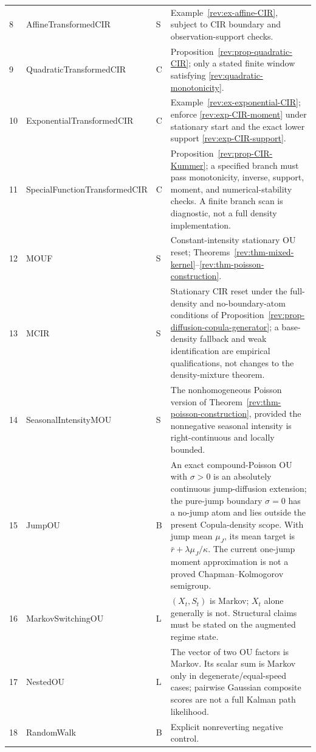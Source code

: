 \documentclass[11pt]{article}
\theoremstyle{remark}
\begin{document}
\begin{longtable}{p{}p{}p{}p{}}
8 & AffineTransformedCIR & S & Example~\ref{rev:ex-affine-CIR}, subject to CIR boundary and observation-support checks.\\
9 & Quadratic\allowbreak{}TransformedCIR & C & Proposition~\ref{rev:prop-quadratic-CIR}; only a stated finite window satisfying \eqref{rev:quadratic-monotonicity}.\\
10 & Exponential\allowbreak{}TransformedCIR & C & Example~\ref{rev:ex-exponential-CIR}; enforce \eqref{rev:exp-CIR-moment} under stationary start and the exact lower support \eqref{rev:exp-CIR-support}.\\
11 & SpecialFunction\allowbreak{}TransformedCIR & C & Proposition~\ref{rev:prop-CIR-Kummer}; a specified branch must pass monotonicity, inverse, support, moment, and numerical-stability checks.  A finite branch scan is diagnostic, not a full density implementation.\\
12 & MOUF & S & Constant-intensity stationary OU reset; Theorems~\ref{rev:thm-mixed-kernel}--\ref{rev:thm-poisson-construction}.\\
13 & MCIR & S & Stationary CIR reset under the full-density and no-boundary-atom conditions of Proposition~\ref{rev:prop-diffusion-copula-generator}; a base-density fallback and weak identification are empirical qualifications, not changes to the density-mixture theorem.\\
14 & SeasonalIntensity\allowbreak{}MOU & S & The nonhomogeneous Poisson version of Theorem~\ref{rev:thm-poisson-construction}, provided the nonnegative seasonal intensity is right-continuous and locally bounded.\\
15 & JumpOU & B & An exact compound-Poisson OU with $\sigma>0$ is an absolutely continuous jump-diffusion extension; the pure-jump boundary $\sigma=0$ has a no-jump atom and lies outside the present Copula-density scope.  With jump mean $\mu_J$, its mean target is $\bar r+\lambda\mu_J/\kappa$.  The current one-jump moment approximation is not a proved Chapman--Kolmogorov semigroup.\\
16 & MarkovSwitching\allowbreak{}OU & L & $(X_t,S_t)$ is Markov; $X_t$ alone generally is not.  Structural claims must be stated on the augmented regime state.\\
17 & NestedOU & L & The vector of two OU factors is Markov.  Its scalar sum is Markov only in degenerate/equal-speed cases; pairwise Gaussian composite scores are not a full Kalman path likelihood.\\
18 & RandomWalk & B & Explicit nonreverting negative control.\\

\end{longtable}
\end{document}
